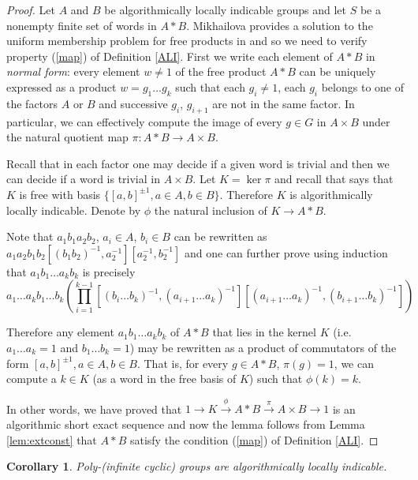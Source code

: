 \documentclass[12pt, a4paper]{amsart}
\newtheorem{Cor}[Thm]{Corollary}
\theoremstyle{remark}
\theoremstyle{definition}
\begin{document}
\begin{proof} Let $A$ and $B$ be algorithmically locally indicable groups and let $S$ be a nonempty finite set of words in $A*B$. Mikhailova provides a solution to the uniform membership problem for free products in \cite{Mikhailova68} and so we need to verify property (\ref{map}) of Definition \ref{ALI}. First we write each element of $A*B$ in \emph{normal form}: every element $w\neq 1$ of the free product $A*B$ can be uniquely expressed as a product $w=g_1\ldots g_k$ such that each $g_i \neq 1$, each $g_i$ belongs to one of the factors $A$ or $B$ and successive $g_i$, $g_{i+1}$ are not in the same factor. In particular, we can effectively compute the image of every $g\in G$ in $A\times B$ under the natural quotient map $\pi\colon A*B\to A\times B$. 

Recall that in each factor one may decide if a given word is trivial and then we can decide if a word is trivial in $A\times B$.  Let $K=\ker \pi$ and recall that \cite[Prop. I.1.4]{serre} says that $K$ is free with basis $\{[a,b]^{\pm 1}, a\in A, b\in B\}$. Therefore $K$ is algorithmically locally indicable. Denote by $\phi$ the natural inclusion of $K\to A*B$. 

Note that $a_1b_1a_2b_2$, $a_i \in A$, $b_i \in B$ can be rewritten as $a_1a_2b_1b_2[(b_1 b_2)^{-1},a_2^{-1}][a_2^{-1},b_2^{-1}]$ and one can further prove using induction that $a_1b_1\ldots a_kb_k$ is precisely
$$a_1\ldots a_k b_1\ldots b_k\left(\prod_{i=1}^{k-1}{[(b_i\ldots b_{k})^{-1}, (a_{i+1} \ldots a_{k})^{-1}][(a_{i+1}\ldots a_{k})^{-1}, (b_{i+1}\ldots b_{k})^{-1}] } \right)$$

Therefore any element $a_1b_1\dots a_kb_k$ of $A*B$ that lies in the kernel $K$ (i.e. $a_1\dots a_k=1$ and $b_1\dots b_k=1$) may be rewritten as a product of commutators of the form $[a,b]^{\pm 1}, a\in A, b\in B$. That is, for every $g\in A*B$, $\pi(g)=1$, we can compute a $k\in K$ (as a word in the free basis of $K$) such that $\phi(k)=k$. 

In other words, we have proved that $1\to K\stackrel{\phi}{\to}A*B\stackrel{\pi}{\to}A\times B\to 1$ is an algorithmic short exact sequence and now the lemma follows from  Lemma \ref{lem:extconst}  that $A*B$ satisfy the condition (\ref{map}) of Definition \ref{ALI}.

 \end{proof}

\begin{Cor}\label{cor:SP}
 Poly-(infinite cyclic) groups are algorithmically locally indicable. 
\end{Cor}
\end{document}
